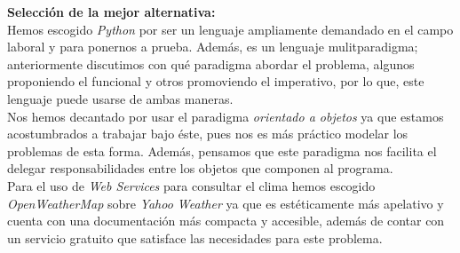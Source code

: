 {\textbf{Selección de la mejor alternativa:}}\\
Hemos escogido \textit{Python} por ser un lenguaje ampliamente demandado en el campo laboral y para
ponernos a prueba. Además, es un lenguaje mulitparadigma; anteriormente discutimos con qué
paradigma abordar el problema, algunos proponiendo el funcional y otros promoviendo el imperativo,
por lo que, este lenguaje puede usarse de ambas maneras.\\

Nos hemos decantado por usar el paradigma \textit{orientado a objetos} ya que estamos acostumbrados
a trabajar bajo éste, pues nos es más práctico modelar los problemas de esta forma. Además,
pensamos que este paradigma nos facilita el delegar responsabilidades entre los objetos que
componen al programa.\\

Para el uso de \textit{Web Services} para consultar el clima hemos escogido \textit{OpenWeatherMap}
sobre \textit{Yahoo Weather} ya que es estéticamente más apelativo y cuenta con una documentación
más compacta y accesible, además de contar con un servicio gratuito que satisface las necesidades
para este problema.
